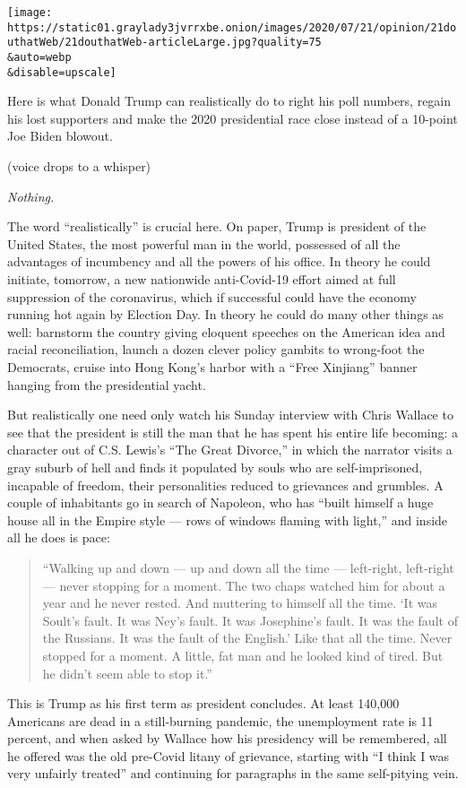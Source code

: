 \texttt{[image: https://static01.graylady3jvrrxbe.onion/images/2020/07/21/opinion/21douthatWeb/21douthatWeb-articleLarge.jpg?quality=75\\\&auto=webp\\\&disable=upscale]}

Here is what Donald Trump can realistically do to right his poll
numbers, regain his lost supporters and make the 2020 presidential race
close instead of a 10-point Joe Biden blowout.

(voice drops to a whisper)

\emph{Nothing.}

The word ``realistically'' is crucial here. On paper, Trump is president
of the United States, the most powerful man in the world, possessed of
all the advantages of incumbency and all the powers of his office. In
theory he could initiate, tomorrow, a new nationwide anti-Covid-19
effort aimed at full suppression of the coronavirus, which if successful
could have the economy running hot again by Election Day. In theory he
could do many other things as well: barnstorm the country giving
eloquent speeches on the American idea and racial reconciliation, launch
a dozen clever policy gambits to wrong-foot the Democrats, cruise into
Hong Kong's harbor with a ``Free Xinjiang'' banner hanging from the
presidential yacht.

But realistically one need only watch his Sunday interview with Chris
Wallace to see that the president is still the man that he has spent his
entire life becoming: a character out of C.S. Lewis's ``The Great
Divorce,'' in which the narrator visits a gray suburb of hell and finds
it populated by souls who are self-imprisoned, incapable of freedom,
their personalities reduced to grievances and grumbles. A couple of
inhabitants go in search of Napoleon, who has ``built himself a huge
house all in the Empire style --- rows of windows flaming with light,''
and inside all he does is pace:

\begin{quote}
``Walking up and down --- up and down all the time --- left-right,
left-right --- never stopping for a moment. The two chaps watched him
for about a year and he never rested. And muttering to himself all the
time. `It was Soult's fault. It was Ney's fault. It was Josephine's
fault. It was the fault of the Russians. It was the fault of the
English.' Like that all the time. Never stopped for a moment. A little,
fat man and he looked kind of tired. But he didn't seem able to stop
it.''
\end{quote}

This is Trump as his first term as president concludes. At least 140,000
Americans are dead in a still-burning pandemic, the unemployment rate is
11 percent, and when asked by Wallace how his presidency will be
remembered, all he offered was the old pre-Covid litany of grievance,
starting with ``I think I was very unfairly treated'' and continuing for
paragraphs in the same self-pitying vein.

